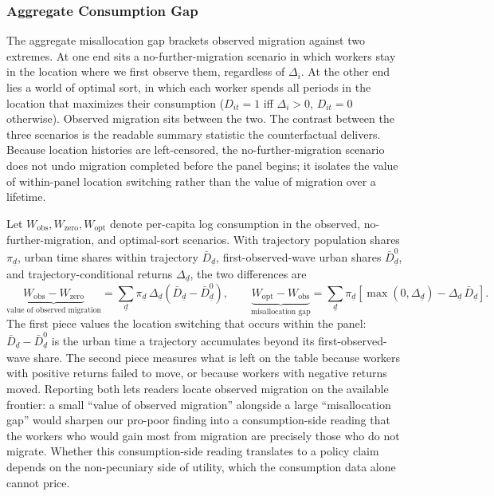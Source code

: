 \documentclass[12pt]{article}
\begin{document}
\subsubsection{Aggregate Consumption Gap}\label{sec:misallocation}

The aggregate misallocation gap brackets observed migration against two extremes.
At one end sits a no-further-migration scenario in which workers stay in the location where we first observe them, regardless of $\Delta_i$.
At the other end lies a world of optimal sort, in which each worker spends all periods in the location that maximizes their consumption ($D_{it} = 1$ iff $\Delta_i > 0$, $D_{it} = 0$ otherwise).
Observed migration sits between the two.
The contrast between the three scenarios is the readable summary statistic the counterfactual delivers.
Because location histories are left-censored, the no-further-migration scenario does not undo migration completed before the panel begins; it isolates the value of within-panel location switching rather than the value of migration over a lifetime.

Let $W_{\text{obs}}, W_{\text{zero}}, W_{\text{opt}}$ denote per-capita log consumption in the observed, no-further-migration, and optimal-sort scenarios.
With trajectory population shares $\pi_{\underline{d}}$, urban time shares within trajectory $\bar{D}_{\underline{d}}$, first-observed-wave urban shares $\bar{D}^0_{\underline{d}}$, and trajectory-conditional returns $\Delta_{\underline{d}}$, the two differences are
\begin{equation}\label{eq:misallocation-decomposition}
    \underbrace{W_{\text{obs}} - W_{\text{zero}}}_{\text{value of observed migration}} = \sum_{\underline{d}} \pi_{\underline{d}} \, \Delta_{\underline{d}} \left(\bar{D}_{\underline{d}} - \bar{D}^0_{\underline{d}}\right), \qquad
    \underbrace{W_{\text{opt}} - W_{\text{obs}}}_{\text{misallocation gap}} = \sum_{\underline{d}} \pi_{\underline{d}} \left[\max(0, \Delta_{\underline{d}}) - \Delta_{\underline{d}} \, \bar{D}_{\underline{d}}\right].
\end{equation}
The first piece values the location switching that occurs within the panel: $\bar{D}_{\underline{d}} - \bar{D}^0_{\underline{d}}$ is the urban time a trajectory accumulates beyond its first-observed-wave share.
The second piece measures what is left on the table because workers with positive returns failed to move, or because workers with negative returns moved.
Reporting both lets readers locate observed migration on the available frontier: a small ``value of observed migration'' alongside a large ``misallocation gap'' would sharpen our pro-poor finding into a consumption-side reading that the workers who would gain most from migration are precisely those who do not migrate.
Whether this consumption-side reading translates to a policy claim depends on the non-pecuniary side of utility, which the consumption data alone cannot price.
\end{document}
